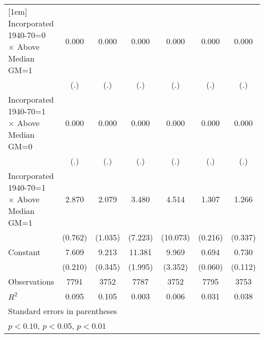 \begin{table}[htbp]
\begin{tabular}{l*{6}{c}}
[1em]
Incorporated 1940-70=0 $\times$ Above Median GM=1&       0.000         &       0.000         &       0.000         &       0.000         &       0.000         &       0.000         \\
                    &         (.)         &         (.)         &         (.)         &         (.)         &         (.)         &         (.)         \\
[1em]
Incorporated 1940-70=1 $\times$ Above Median GM=0&       0.000         &       0.000         &       0.000         &       0.000         &       0.000         &       0.000         \\
                    &         (.)         &         (.)         &         (.)         &         (.)         &         (.)         &         (.)         \\
[1em]
Incorporated 1940-70=1 $\times$ Above Median GM=1&       2.870\sym{***}&       2.079\sym{**} &       3.480         &       4.514         &       1.307\sym{***}&       1.266\sym{***}\\
                    &     (0.762)         &     (1.035)         &     (7.223)         &    (10.073)         &     (0.216)         &     (0.337)         \\
[1em]
Constant            &       7.609\sym{***}&       9.213\sym{***}&      11.381\sym{***}&       9.969\sym{***}&       0.694\sym{***}&       0.730\sym{***}\\
                    &     (0.210)         &     (0.345)         &     (1.995)         &     (3.352)         &     (0.060)         &     (0.112)         \\
\hline
Observations        &        7791         &        3752         &        7787         &        3752         &        7795         &        3753         \\
\(R^{2}\)           &       0.095         &       0.105         &       0.003         &       0.006         &       0.031         &       0.038         \\
\hline\hline
\multicolumn{7}{l}{\footnotesize Standard errors in parentheses}\\
\multicolumn{7}{l}{\footnotesize \sym{*} \(p<0.10\), \sym{**} \(p<0.05\), \sym{***} \(p<0.01\)}\\
\end{tabular}
\end{table}
